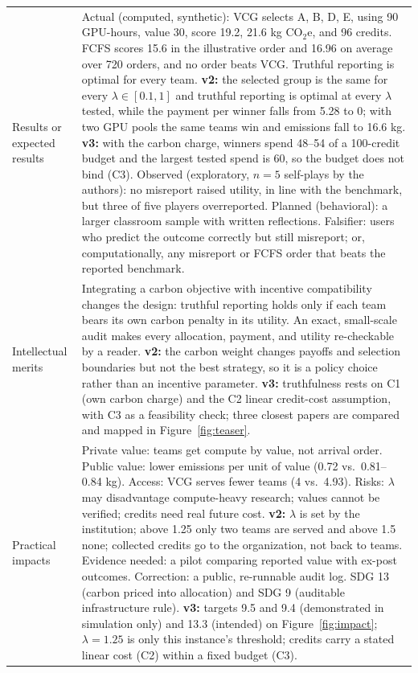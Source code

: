 \begin{table}[H]
\begin{tabularx}{\textwidth}{@{}p{}Y@{}}
Results or expected results & Actual (computed, synthetic): VCG selects A, B, D, E, using 90 GPU-hours, value 30, score 19.2, 21.6 kg CO$_2$e, and 96 credits. FCFS scores 15.6 in the illustrative order and 16.96 on average over 720 orders, and no order beats VCG. Truthful reporting is optimal for every team. \textbf{v2:} the selected group is the same for every $\lambda\in[0.1,1]$ and truthful reporting is optimal at every $\lambda$ tested, while the payment per winner falls from 5.28 to 0; with two GPU pools the same teams win and emissions fall to 16.6 kg. \textbf{v3:} with the carbon charge, winners spend 48--54 of a 100-credit budget and the largest tested spend is 60, so the budget does not bind (C3). Observed (exploratory, $n=5$ self-plays by the authors): no misreport raised utility, in line with the benchmark, but three of five players overreported. Planned (behavioral): a larger classroom sample with written reflections. Falsifier: users who predict the outcome correctly but still misreport; or, computationally, any misreport or FCFS order that beats the reported benchmark. \\
Intellectual merits & Integrating a carbon objective with incentive compatibility changes the design: truthful reporting holds only if each team bears its own carbon penalty in its utility. An exact, small-scale audit makes every allocation, payment, and utility re-checkable by a reader. \textbf{v2:} the carbon weight changes payoffs and selection boundaries but not the best strategy, so it is a policy choice rather than an incentive parameter. \textbf{v3:} truthfulness rests on C1 (own carbon charge) and the C2 linear credit-cost assumption, with C3 as a feasibility check; three closest papers are compared and mapped in Figure~\ref{fig:teaser}. \\
Practical impacts & Private value: teams get compute by value, not arrival order. Public value: lower emissions per unit of value (0.72 vs.\ 0.81--0.84 kg). Access: VCG serves fewer teams (4 vs.\ 4.93). Risks: $\lambda$ may disadvantage compute-heavy research; values cannot be verified; credits need real future cost. \textbf{v2:} $\lambda$ is set by the institution; above 1.25 only two teams are served and above 1.5 none; collected credits go to the organization, not back to teams. Evidence needed: a pilot comparing reported value with ex-post outcomes. Correction: a public, re-runnable audit log. SDG 13 (carbon priced into allocation) and SDG 9 (auditable infrastructure rule). \textbf{v3:} targets 9.5 and 9.4 (demonstrated in simulation only) and 13.3 (intended) on Figure~\ref{fig:impact}; $\lambda=1.25$ is only this instance's threshold; credits carry a stated linear cost (C2) within a fixed budget (C3). \\

\end{tabularx}
\end{table}

